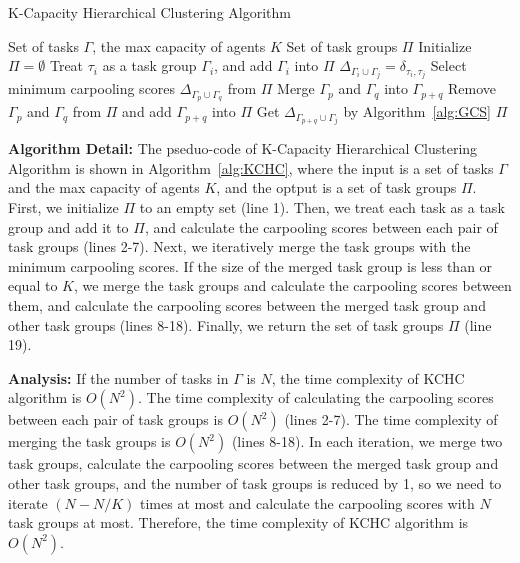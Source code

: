\documentclass[sigconf,anonymous]{aamas}
\begin{document}
\begin{algorithm}[htbp]
\caption{K-Capacity Hierarchical Clustering Algorithm}
\label{alg:KCHC}

\begin{algorithmic}[1]
\Require Set of tasks $\Gamma$, the max capacity of agents $K$ %
\Ensure Set of task groups ${\Pi}$ %
\State Initialize ${\Pi} = \emptyset$
    \State Treat $\tau_{i}$ as a task group $\Gamma_{i}$, and add $\Gamma_{i}$ into ${\Pi}$
        \State $\Delta_{\Gamma_i \cup \Gamma_j} = \delta_{\tau_i, \tau_j}$
    \EndFor
\EndFor
{}
    \State Select minimum carpooling scores $\Delta_{\Gamma_p \cup \Gamma_q}$ from $\Pi$
    \State Merge $\Gamma_p$ and $\Gamma_q$ into $\Gamma_{p+q}$
    \State Remove $\Gamma_p$ and $\Gamma_q$ from $\Pi$ and add $\Gamma_{p+q}$ into $\Pi$
            \State Get $\Delta_{\Gamma_{p+q} \cup \Gamma_j}$ by Algorithm~\ref{alg:GCS}
        \EndIf
    \EndFor
\EndWhile
\State \Return $\Pi$
\end{algorithmic}
\end{algorithm}

\textbf{Algorithm Detail:}
The pseduo-code of K-Capacity Hierarchical Clustering Algorithm is shown in Algorithm~\ref{alg:KCHC},
where the input is a set of tasks $\Gamma$ and the max capacity of agents $K$,
and the optput is a set of task groups $\Pi$.
First, we initialize $\Pi$ to an empty set (line 1).
Then, we treat each task as a task group and add it to $\Pi$,
and calculate the carpooling scores between each pair of task groups (lines 2-7).
Next, we iteratively merge the task groups with the minimum carpooling scores.
If the size of the merged task group is less than or equal to $K$,
we merge the task groups and calculate the carpooling scores between them,
and calculate the carpooling scores between the merged task group and other task groups (lines 8-18).
Finally, we return the set of task groups $\Pi$ (line 19).

\textbf{Analysis:}
If the number of tasks in $\Gamma$ is $N$,
the time complexity of KCHC algorithm is $O(N^2)$.
The time complexity of calculating the carpooling scores between each pair of task groups is $O(N^2)$ (lines 2-7).
The time complexity of merging the task groups is $O(N^2)$ (lines 8-18).
In each iteration, we merge two task groups, calculate the carpooling scores between the merged task group and other task groups,
and the number of task groups is reduced by 1,
so we need to iterate $(N-N/K)$ times at most 
and calculate the carpooling scores with $N$ task groups at most.
Therefore, the time complexity of KCHC algorithm is $O(N^2)$.
\end{document}
